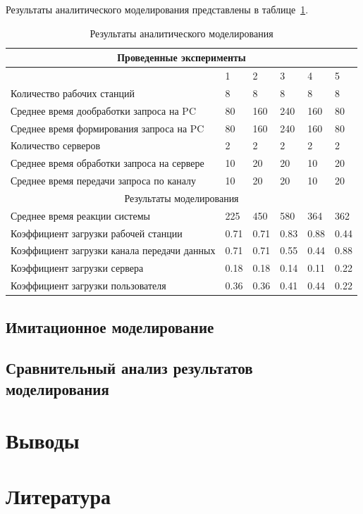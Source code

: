 \documentclass[russian,utf8,emptystyle]{eskdtext}
\begin{document}
Результаты аналитического моделирования представлены в таблице~\ref{tab:anal-result}.

\begin{longtable}{p{10cm}|p{1cm}|p{1cm}|p{1cm}|p{1cm}|p{1cm}}
\caption{Результаты аналитического моделирования}
\label{tab:anal-result} \\
\hline
\multicolumn{6}{c}{Проведенные эксперименты} \\ \hline
                                                    & 1      & 2      & 3      & 4      & 5       \\ \cline{2-6}
Количество рабочих станций                          & 8      & 8      & 8      & 8      & 8      \\
Среднее время дообработки запроса на PC             & 80     & 160    & 240    & 160    & 80     \\
Среднее время формирования запроса на PC            & 80     & 160    & 240    & 160    & 80     \\
Количество серверов                                 & 2      & 2      & 2      & 2      & 2      \\
Среднее время обработки запроса на сервере          & 10     & 20     & 20     & 10     & 20     \\
Среднее время передачи запроса по каналу            & 10     & 20     & 20     & 10     & 20     \\  
\hline
\multicolumn{6}{c}{Результаты моделирования} \\ 
\hline
Среднее время реакции системы                       & 225    & 450    & 580    & 364    & 362    \\
Коэффициент загрузки рабочей станции                & 0.71   & 0.71   & 0.83   & 0.88   & 0.44   \\
Коэффициент загрузки канала передачи данных         & 0.71   & 0.71   & 0.55   & 0.44   & 0.88   \\
Коэффициент загрузки сервера                        & 0.18   & 0.18   & 0.14   & 0.11   & 0.22   \\
Коэффициент загрузки пользователя                   & 0.36   & 0.36   & 0.41   & 0.44   & 0.22   \\
\end{longtable}

\subsection{Имитационное моделирование}
\subsection{Сравнительный анализ результатов моделирования}

\clearpage
\section{Выводы}

\clearpage
\section{Литература}
\end{document}
